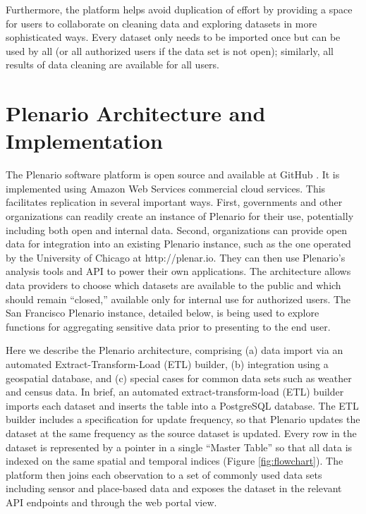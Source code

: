 \documentclass[11pt]{article}
\begin{document}
Furthermore, the platform helps avoid duplication of effort by providing a space for users to collaborate on cleaning data and exploring datasets in more sophisticated ways. Every dataset only needs to be imported once but can be used by all (or all authorized users if the data set is not open); similarly, all results of data cleaning are available for all users.

\section{Plenario Architecture and Implementation}
The Plenario software platform is open source and available at GitHub \cite{plenario-github}. It is implemented using Amazon Web Services commercial cloud services. This facilitates replication in several important ways. First, governments and other organizations can readily create an instance of Plenario for their use, potentially including both open and internal data. Second, organizations can provide open data for integration into an existing Plenario instance, such as the one operated by the University of Chicago at http://plenar.io. They can then use Plenario's analysis tools and API to power their own applications. The architecture allows data providers to choose which datasets are available to the public and which should remain ``closed,'' available only for internal use for authorized users. The San Francisco Plenario instance, detailed below, is being used to explore functions for aggregating sensitive data prior to presenting to the end user. 

Here we describe the Plenario architecture, comprising (a) data import via an automated Extract-Transform-Load (ETL) builder, (b) integration using a geospatial database, and (c) special cases for common data sets such as weather and census data. In brief, an automated extract-transform-load (ETL) builder imports each dataset and inserts the table into a PostgreSQL database. The ETL builder includes a specification for update frequency, so that Plenario updates the dataset at the same frequency as the source dataset is updated. Every row in the dataset is represented by a pointer in a single ``Master Table'' so that all data is indexed on the same spatial and temporal indices (Figure \ref{fig:flowchart}). The platform then joins each observation to a set of commonly used data sets including sensor and place-based data and exposes the dataset in the relevant API endpoints and through the web portal view.
\end{document}
